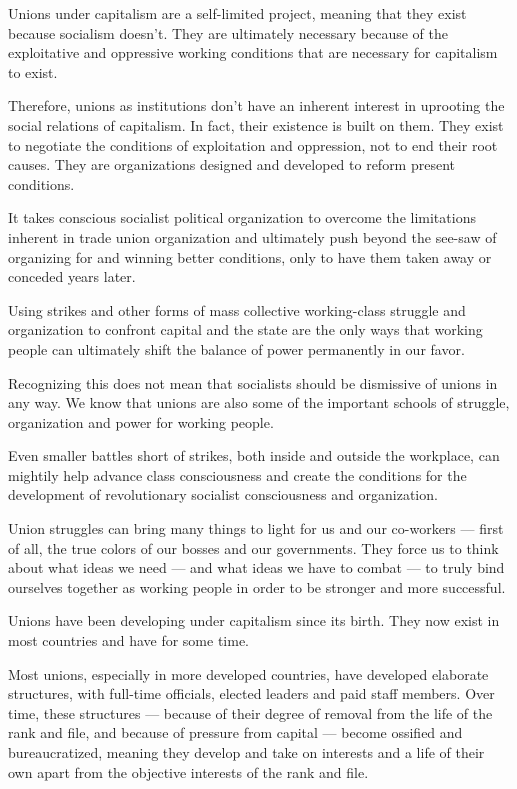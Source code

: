 Unions under capitalism are a self-limited project, meaning that they exist because socialism doesn’t. They are ultimately necessary because of the exploitative and oppressive working conditions that are necessary for capitalism to exist.

Therefore, unions as institutions don’t have an inherent interest in uprooting the social relations of capitalism. In fact, their existence is built on them. They exist to negotiate the conditions of exploitation and oppression, not to end their root causes. They are organizations designed and developed to reform present conditions.

It takes conscious socialist political organization to overcome the limitations inherent in trade union organization and ultimately push beyond the see-saw of organizing for and winning better conditions, only to have them taken away or conceded years later.

Using strikes and other forms of mass collective working-class struggle and organization to confront capital and the state are the only ways that working people can ultimately shift the balance of power permanently in our favor.

Recognizing this does not mean that socialists should be dismissive of unions in any way. We know that unions are also some of the important schools of struggle, organization and power for working people.

Even smaller battles short of strikes, both inside and outside the workplace, can mightily help advance class consciousness and create the conditions for the development of revolutionary socialist consciousness and organization.

Union struggles can bring many things to light for us and our co-workers — first of all, the true colors of our bosses and our governments. They force us to think about what ideas we need — and what ideas we have to combat — to truly bind ourselves together as working people in order to be stronger and more successful.

\sectiondivider

Unions have been developing under capitalism since its birth. They now exist in most countries and have for some time.

Most unions, especially in more developed countries, have developed elaborate structures, with full-time officials, elected leaders and paid staff members. Over time, these structures — because of their degree of removal from the life of the rank and file, and because of pressure from capital — become ossified and bureaucratized, meaning they develop and take on interests and a life of their own apart from the objective interests of the rank and file.

